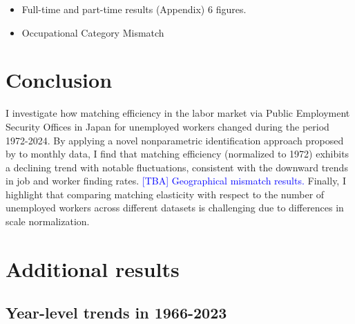 \documentclass[12pt]{article}
\begin{document}
\begin{itemize}
    \item Full-time and part-time results (Appendix) 6 figures.
    \item Occupational Category Mismatch
\end{itemize}





\section{Conclusion}

I investigate how matching efficiency in the labor market via Public Employment Security Offices in Japan for unemployed workers changed during the period 1972-2024. By applying a novel nonparametric identification approach proposed by \cite{lange2020beyond} to monthly data, I find that matching efficiency (normalized to 1972) exhibits a declining trend with notable fluctuations, consistent with the downward trends in job and worker finding rates. \textcolor{blue}{[TBA] Geographical mismatch results.} Finally, I highlight that comparing matching elasticity with respect to the number of unemployed workers across different datasets is challenging due to differences in scale normalization.








\newpage

\appendix
\section{Additional results}\label{sec:year_data}
\subsection{Year-level trends in 1966-2023}
\end{document}
